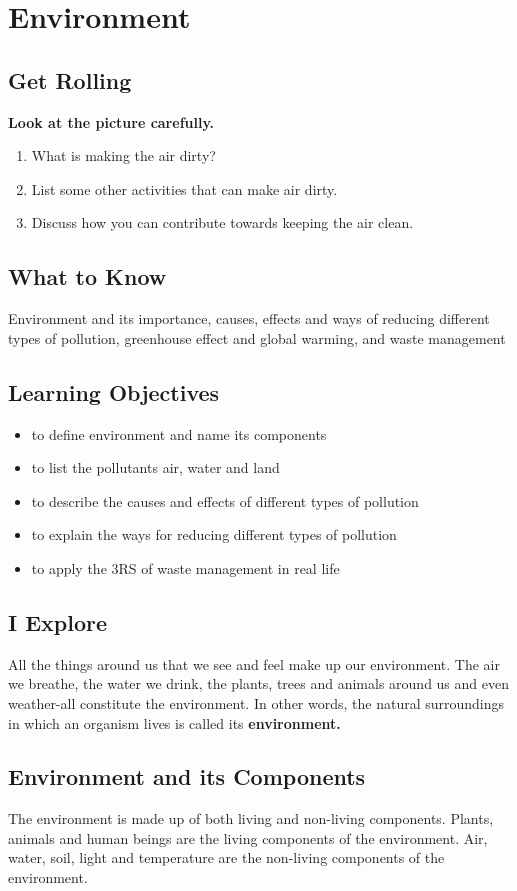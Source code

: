 \chapter{Environment}
\section{Get Rolling}
\textbf{Look at the picture carefully.}
\vspace{1.4in}
\begin{enumerate}
    \item What is making the air dirty?
    \item List some other activities that can make air dirty.
    \item Discuss how you can contribute towards keeping the air clean.
\end{enumerate}
\section{What to Know}
Environment and its importance, causes, effects and ways of reducing different types of pollution, greenhouse effect and global warming, and waste management
\section{\textbf{Learning Objectives}}
\begin{itemize}
    \item to define environment and name its components
    \item to list the pollutants air, water and land
    \item to describe the causes and effects of different types of pollution
    \item to explain the ways for reducing different types of pollution
    \item to apply the 3RS of waste management in real life
\end{itemize}
\section{I Explore}
All the things around us that we see and feel make up our environment. The air we breathe, the water we drink, the plants, trees and animals around us and even weather-all constitute the environment. In other words, the natural surroundings in which an organism lives is called its \textbf{environment.}
\section{Environment and its Components}
The environment is made up of both living and non-living components. Plants, animals and human beings are the living components of the environment. Air, water, soil, light and temperature are the non-living components of the environment.

